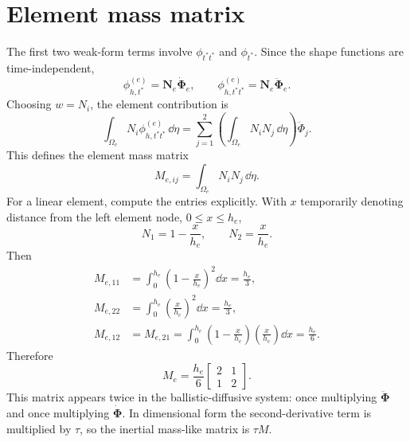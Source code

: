 \documentclass[11pt]{article}
\begin{document}
\section{Element mass matrix}
The first two weak-form terms involve \(\phi_{t^*t^*}\) and \(\phi_{t^*}\). Since the shape functions are time-independent,
\begin{equation}
    \phi_{h,t^*}^{(e)}=\bm{N}_e\dot{\bm{\Phi}}_e,
    \qquad
    \phi_{h,t^*t^*}^{(e)}=\bm{N}_e\ddot{\bm{\Phi}}_e.
\end{equation}
Choosing \(w=N_i\), the element contribution is
\begin{equation}
    \int_{\Omega_e} N_i\phi_{h,t^*t^*}^{(e)}\,\dd\eta
    =\sum_{j=1}^{2}\left(\int_{\Omega_e}N_iN_j\,\dd\eta\right)\ddot\Phi_j.
\end{equation}
This defines the element mass matrix
\begin{equation}
    \boxed{M_{e,ij}=\int_{\Omega_e}N_iN_j\,\dd\eta.}
    \label{eq:element_mass_def}
\end{equation}
For a linear element, compute the entries explicitly. With \(x\) temporarily denoting distance from the left element node, \(0\le x\le h_e\),
\begin{equation}
    N_1=1-\frac{x}{h_e},
    \qquad
    N_2=\frac{x}{h_e}.
\end{equation}
Then
\begin{align}
    M_{e,11}&=\int_0^{h_e}\left(1-\frac{x}{h_e}\right)^2\dd x=\frac{h_e}{3},\\
    M_{e,22}&=\int_0^{h_e}\left(\frac{x}{h_e}\right)^2\dd x=\frac{h_e}{3},\\
    M_{e,12}&=M_{e,21}=\int_0^{h_e}\left(1-\frac{x}{h_e}\right)\left(\frac{x}{h_e}\right)\dd x=\frac{h_e}{6}.
\end{align}
Therefore
\begin{equation}
    \boxed{
    M_e=\frac{h_e}{6}
    \begin{bmatrix}
    2 & 1\\
    1 & 2
    \end{bmatrix}.}
    \label{eq:linear_element_mass}
\end{equation}
This matrix appears twice in the ballistic-diffusive system: once multiplying \(\ddot{\bm{\Phi}}\) and once multiplying \(\dot{\bm{\Phi}}\). In dimensional form the second-derivative term is multiplied by \(\tau\), so the inertial mass-like matrix is \(\tau M\).
\end{document}
